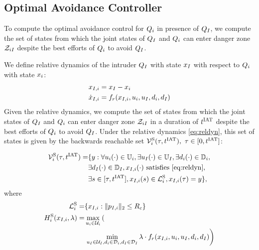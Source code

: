 \subsection{Optimal Avoidance Controller} \label{sec:intruder_avoid}
To compute the optimal avoidance control for $Q_i$ in presence of $Q_{I}$, we compute the set of states from which the joint states of $Q_{I}$ and $Q_i$ can enter danger zone $\mathcal{Z}_{iI}$ despite the best efforts of $Q_i$ to avoid $Q_{I}$. 

We define relative dynamics of the intruder $Q_{I}$ with state $x_I$ with respect to $Q_i$ with state $x_i$:
\begin{equation}
\label{eq:reldyn}
\begin{aligned}
\state_{\intr, i} &= \state_\intr - \state_i \\
\dot \state_{\intr, i} &= f_r(\state_{\intr, i}, \ctrl_i, \ctrl_\intr, \dstb_i, \dstb_\intr)
\end{aligned}
\end{equation}
Given the relative dynamics, we compute the set of states from which the joint states of $Q_{I}$ and $Q_{i}$ can enter danger zone $\mathcal{Z}_{iI}$ in a duration of $t^\text{IAT}$ despite the best efforts of $Q_i$ to avoid $Q_{I}$. Under the relative dynamics \eqref{eq:reldyn}, this set of states is given by the backwards reachable set $\mathcal{V}^{\text{S}}_i(\tau, t^\text{IAT}),~ \tau \in [0, t^\text{IAT}]$:

\begin{equation} \label{eqn:avoidBRS}
\begin{aligned}
\brs^{\text{S}}_{i}(\tau, \iat) = & \{y: \forall \ctrl_i(\cdot) \in \cfset_i, \exists \ctrl_\intr(\cdot) \in \cfset_\intr, \exists \dstb_i(\cdot) \in \dfset_i, \\
& \exists \dstb_\intr(\cdot) \in \dfset_\intr, \state_{\intr, i}(\cdot) \text{ satisfies \eqref{eq:reldyn}},\\
& \exists s \in [\tau, \iat], \state_{\intr, i}(s) \in \targetset^{\text{S}}_{i}, \state_{\intr, i}(\tau) = y\},
\end{aligned}
\end{equation}
where 
\begin{equation}
\begin{aligned}
\mathcal{L}^{\text{S}}_{i} = & \{x_{I, i}: \|p_{I, i}\|_2 \le R_c\} \\
H^{\text{S}}_{i}(x_{I, i}, \lambda) = & \max_{u_i \in \mathcal{U}_i} \left( \right.\\
&\left. \min_{u_I \in \mathcal{U}_I, d_i \in \mathcal{D}_i, d_I \in \mathcal{D}_I} \lambda \cdot f_r(x_{I, i}, u_i, u_I, d_i, d_I) \right)
\end{aligned}
\end{equation}

